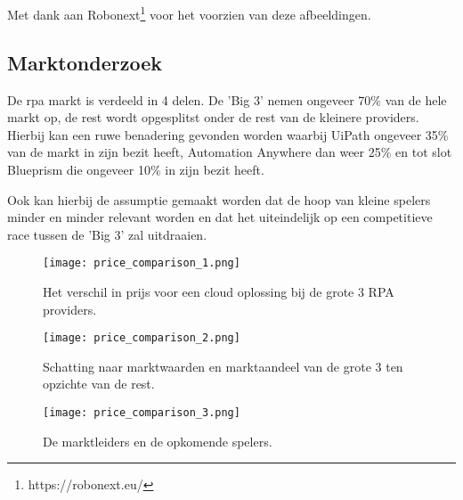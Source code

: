 \chapter{}

Met dank aan Robonext\footnote{https://robonext.eu/} voor het voorzien van deze afbeeldingen.

\section{Marktonderzoek}
De \acrshort{rpa} markt is verdeeld in 4 delen. De 'Big 3' nemen ongeveer 70\% van de hele markt op, de rest wordt opgesplitst onder de rest van de kleinere providers. Hierbij kan een ruwe benadering gevonden worden waarbij UiPath ongeveer 35\% van de markt in zijn bezit heeft, Automation Anywhere dan weer 25\% en tot slot Blueprism die ongeveer 10\% in zijn bezit heeft. \autocite{marktRPA}

Ook kan hierbij de assumptie gemaakt worden dat de hoop van kleine spelers minder en minder relevant worden en dat het uiteindelijk op een competitieve race tussen de 'Big 3' zal uitdraaien. \autocite{marktRPA}

\begin{figure}[h]
	\texttt{[image: price\_comparison\_1.png]}
	\caption[Cloud editie benchmarks]{Het verschil in prijs voor een cloud oplossing bij de grote 3 RPA providers.}
	\label{fig:price_1}
\end{figure}
\begin{figure}[h]
	\texttt{[image: price\_comparison\_2.png]}
	\caption[Grote 3 Revenue Streams]{Schatting naar marktwaarden en marktaandeel van de grote 3 ten opzichte van de rest.}
	\label{fig:price_2}
\end{figure}
\begin{figure}[h]
	\texttt{[image: price\_comparison\_3.png]}
	\caption[Benchmarkings]{De marktleiders en de opkomende spelers.}
	\label{fig:price_3}
\end{figure}